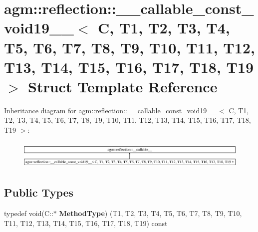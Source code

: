 \hypertarget{structagm_1_1reflection_1_1____callable__const__void19____}{}\section{agm\+:\+:reflection\+:\+:\+\_\+\+\_\+callable\+\_\+const\+\_\+void19\+\_\+\+\_\+$<$ C, T1, T2, T3, T4, T5, T6, T7, T8, T9, T10, T11, T12, T13, T14, T15, T16, T17, T18, T19 $>$ Struct Template Reference}
\label{structagm_1_1reflection_1_1____callable__const__void19____}
Inheritance diagram for agm\+:\+:reflection\+:\+:\+\_\+\+\_\+callable\+\_\+const\+\_\+void19\+\_\+\+\_\+$<$ C, T1, T2, T3, T4, T5, T6, T7, T8, T9, T10, T11, T12, T13, T14, T15, T16, T17, T18, T19 $>$\+:\begin{figure}[H]
\begin{center}
\leavevmode
\includegraphics[height=1.396509cm]{structagm_1_1reflection_1_1____callable__const__void19____}
\end{center}
\end{figure}
\subsection*{Public Types}
\begin{DoxyCompactItemize}
\item 
typedef void(C\+::$\ast$ {\bfseries Method\+Type}) (T1, T2, T3, T4, T5, T6, T7, T8, T9, T10, T11, T12, T13, T14, T15, T16, T17, T18, T19) const \hypertarget{structagm_1_1reflection_1_1____callable__const__void19_____a6bd66a416847af7144f1d76b6fab151a}{}\label{structagm_1_1reflection_1_1____callable__const__void19_____a6bd66a416847af7144f1d76b6fab151a}

\end{DoxyCompactItemize}
